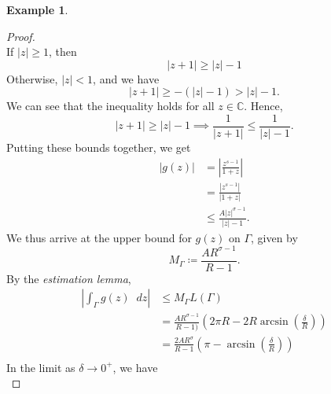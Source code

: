 \documentclass[a4paper]{article}
\newcommand*\diff{\mathop{}\!d} %
\newcommand{\C}{\mathbb{C}}
\theoremstyle{definition}
\newtheorem{example}[theorem]{Example}
\begin{document}
\begin{example}
\begin{proof}
\begin{equation*}
        \end{equation*}
        If $\lvert z \rvert \geq 1$, then
        \begin{equation*}
            \lvert z + 1 \rvert \geq \lvert z \rvert - 1
        \end{equation*}
        Otherwise, $\lvert z \rvert < 1$, and we have
        \begin{equation*}
            \lvert z + 1 \rvert \geq -(\lvert z \rvert - 1) > \lvert z \rvert - 1.
        \end{equation*}
        We can see that the inequality holds for all $z \in \C$.
        Hence,
        \begin{equation*}
            \lvert z + 1 \rvert \geq \lvert z \rvert - 1 \implies \frac{1}{\lvert z + 1 \rvert} \leq \frac{1}{\lvert z \rvert - 1}.
        \end{equation*}
        Putting these bounds together, we get
        \begin{align*}
            \lvert g(z) \rvert & = \left\lvert \frac{z^{s-1}}{1+z} \right\rvert                 \\
                               & = \frac{\left\lvert z^{s-1} \right\rvert}{\lvert 1+z \rvert}   \\
                               & \leq \frac{A \lvert z \rvert^{\sigma-1}}{\lvert z \rvert - 1}.
        \end{align*}
        We thus arrive at the upper bound for $g(z)$ on $\Gamma$, given by
        \begin{equation*}
            M_\Gamma \coloneq \frac{A R^{\sigma-1}}{R-1}.
        \end{equation*}
        By the \emph{estimation lemma},
        \begin{align*}
            \left\lvert \int_\Gamma g(z) \diff z \right\rvert & \leq M_\Gamma L(\Gamma)                                                                          \\
                                                              & = \frac{A R^{\sigma-1}}{R-1)} \left( 2\pi R - 2 R \arcsin \left( \frac{\delta}{R}\right) \right) \\
                                                              & = \frac{2A R^\sigma}{R-1} \left(\pi - \arcsin \left( \frac{\delta}{R}\right) \right)             \\
        \end{align*}
        In the limit as $\delta \to 0^+$, we have
        \begin{equation*}

\end{equation*}
\end{proof}
\end{example}
\end{document}
